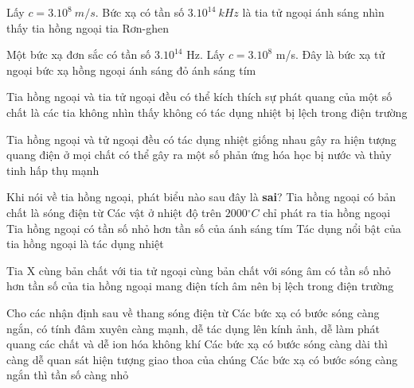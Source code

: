 \begin{ex}%
 Lấy $c=3.10^8\ m/s$. Bức xạ có tần số $3.10^{14}\ kHz$ là
\choice
{tia tử ngoại}
{ánh sáng nhìn thấy} 
{tia hồng ngoại}
{\True tia Rơn-ghen}
\end{ex} 
\begin{ex}%
 Một bức xạ đơn sắc có tần số $3.10^{14}$ Hz. Lấy $c = 3.10^8$ m/s. Đây là
\choice
{bức xạ tử ngoại}
{\True bức xạ hồng ngoại}
{ánh sáng đỏ}
{ánh sáng tím}
\end{ex} 
\begin{ex}%
Tia hồng ngoại và tia tử ngoại đều
\choice
{có thể kích thích sự phát quang của một số chất}
{\True là các tia không nhìn thấy}
{không có tác dụng nhiệt}
{bị lệch trong điện trường}
\end{ex} 
\begin{ex}%
Tia hồng ngoại và tử ngoại đều
\choice
{có tác dụng nhiệt giống nhau}
{gây ra hiện tượng quang điện ở mọi chất}
{\True có thể gây ra một số phản ứng hóa học}
{bị nước và thủy tinh hấp thụ mạnh}
\end{ex} 
\begin{ex}%
Khi nói về tia hồng ngoại, phát biểu nào sau đây là \textbf{sai}?
\choice
{Tia hồng ngoại có bản chất là sóng điện từ}
{\True Các vật ở nhiệt độ trên $2000{^\circ}C$ chỉ phát ra tia hồng ngoại}
{Tia hồng ngoại có tần số nhỏ hơn tần số của ánh sáng tím}
{Tác dụng nổi bật của tia hồng ngoại là tác dụng nhiệt}
\end{ex} 
\begin{ex}%
Tia X
\choice
{\True cùng bản chất với tia tử ngoại}
{cùng bản chất với sóng âm}
{có tần số nhỏ hơn tần số của tia hồng ngoại}
{mang điện tích âm nên bị lệch trong điện trường}
\end{ex} 
\begin{ex}%
Cho các nhận định sau về thang sóng điện từ
{\True Các bức xạ có bước sóng càng ngắn, có tính đâm xuyên càng mạnh, dễ tác dụng lên kính ảnh, dễ làm phát quang các chất và dễ ion hóa không khí}
{\True Các bức xạ có bước sóng càng dài thì càng dễ quan sát hiện tượng giao thoa của chúng}
{Các bức xạ có bước sóng càng ngắn thì tần số càng nhỏ}
\loigiai{
\begin{itemchoice}
\itemch
\itemch
\itemch
\itemch
\end{itemchoice}
}
\end{ex} 

